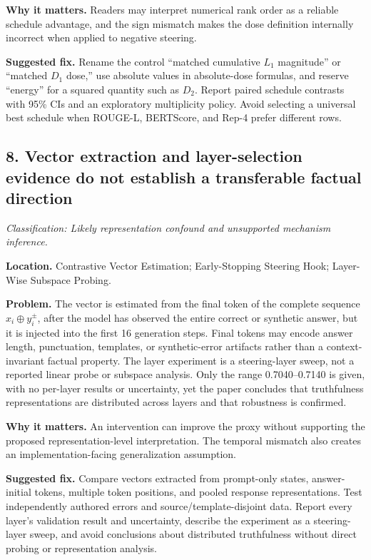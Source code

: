 \documentclass[11pt]{article}
\newcommand{\findinglabel}[1]{\textbf{#1}}
\newcommand{\classification}[1]{\textit{Classification: #1.}}
\begin{document}
\findinglabel{Why it matters.} Readers may interpret numerical rank order as a reliable schedule advantage, and the sign mismatch makes the dose definition internally incorrect when applied to negative steering.

\findinglabel{Suggested fix.} Rename the control ``matched cumulative $L_1$ magnitude'' or ``matched $D_1$ dose,'' use absolute values in absolute-dose formulas, and reserve ``energy'' for a squared quantity such as $D_2$.  Report paired schedule contrasts with 95\% CIs and an exploratory multiplicity policy.  Avoid selecting a universal best schedule when ROUGE-L, BERTScore, and Rep-4 prefer different rows.

\subsection*{8. Vector extraction and layer-selection evidence do not establish a transferable factual direction}

\classification{Likely representation confound and unsupported mechanism inference}

\findinglabel{Location.} Contrastive Vector Estimation; Early-Stopping Steering Hook; Layer-Wise Subspace Probing.

\findinglabel{Problem.} The vector is estimated from the final token of the complete sequence $x_i\oplus y_i^{\pm}$, after the model has observed the entire correct or synthetic answer, but it is injected into the first 16 generation steps.  Final tokens may encode answer length, punctuation, templates, or synthetic-error artifacts rather than a context-invariant factual property.  The layer experiment is a steering-layer sweep, not a reported linear probe or subspace analysis.  Only the range 0.7040--0.7140 is given, with no per-layer results or uncertainty, yet the paper concludes that truthfulness representations are distributed across layers and that robustness is confirmed.

\findinglabel{Why it matters.} An intervention can improve the proxy without supporting the proposed representation-level interpretation.  The temporal mismatch also creates an implementation-facing generalization assumption.

\findinglabel{Suggested fix.} Compare vectors extracted from prompt-only states, answer-initial tokens, multiple token positions, and pooled response representations.  Test independently authored errors and source/template-disjoint data.  Report every layer's validation result and uncertainty, describe the experiment as a steering-layer sweep, and avoid conclusions about distributed truthfulness without direct probing or representation analysis.
\end{document}
